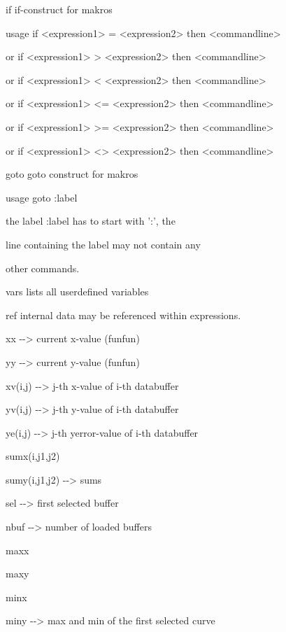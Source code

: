 \documentclass[]{article}
\begin{document}
if if-construct for makros

usage if \textless{}expression1\textgreater{} =
\textless{}expression2\textgreater{} then
\textless{}commandline\textgreater{}

or if \textless{}expression1\textgreater{} \textgreater{}
\textless{}expression2\textgreater{} then
\textless{}commandline\textgreater{}

or if \textless{}expression1\textgreater{} \textless{}
\textless{}expression2\textgreater{} then
\textless{}commandline\textgreater{}

or if \textless{}expression1\textgreater{} \textless{}=
\textless{}expression2\textgreater{} then
\textless{}commandline\textgreater{}

or if \textless{}expression1\textgreater{} \textgreater{}=
\textless{}expression2\textgreater{} then
\textless{}commandline\textgreater{}

or if \textless{}expression1\textgreater{} \textless{}\textgreater{}
\textless{}expression2\textgreater{} then
\textless{}commandline\textgreater{}

goto goto construct for makros

usage goto :label

the label :label has to start with ':', the

line containing the label may not contain any

other commands.

vars lists all userdefined variables

ref internal data may be referenced within expressions.

xx -\/-\textgreater{} current x-value (funfun)

yy -\/-\textgreater{} current y-value (funfun)

xv(i,j) -\/-\textgreater{} j-th x-value of i-th databuffer

yv(i,j) -\/-\textgreater{} j-th y-value of i-th databuffer

ye(i,j) -\/-\textgreater{} j-th yerror-value of i-th databuffer

sumx(i,j1,j2)

sumy(i,j1,j2) -\/-\textgreater{} sums

sel -\/-\textgreater{} first selected buffer

nbuf -\/-\textgreater{} number of loaded buffers

maxx

maxy

minx

miny -\/-\textgreater{} max and min of the first selected curve
\end{document}
